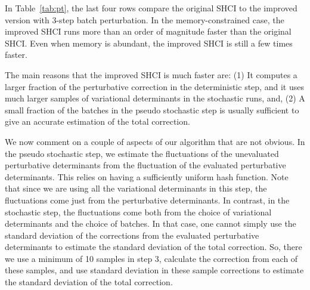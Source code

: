\documentclass[%
reprint,
 superscriptaddress,
 amsmath,amssymb,
 aps,
]{revtex4-1}
\begin{document}

In Table~\ref{tab:pt}, the last four rows compare the original SHCI to the improved version with 3-step batch perturbation.
In the memory-constrained case, the improved SHCI runs more than an order of magnitude faster than the original SHCI.
Even when memory is abundant, the improved SHCI is still a few times faster.

The main reasons that the improved SHCI is much faster are:
(1) It computes a larger fraction of the perturbative correction in the deterministic step, and it uses much larger samples
of variational determinants in the stochastic runs,
and,
(2) A small fraction of the batches in the pseudo stochastic step is usually sufficient to give an accurate estimation of the total correction.

We now comment on a couple of aspects of our algorithm that are not obvious.
In the pseudo stochastic step, we estimate the fluctuations of the unevaluated perturbative determinants from the fluctuation of the evaluated perturbative determinants.
This relies on having a sufficiently uniform hash function.
Note that since we are using all the variational determinants in this step,
the fluctuations come just from the perturbative determinants.
In contrast, in the stochastic step, the fluctuations come both from the choice of variational determinants and the choice of batches.
In that case, one cannot simply use the standard deviation of the corrections from the evaluated perturbative determinants to estimate the standard deviation of the total correction.
So, there we use a minimum of 10 samples in step 3, calculate the correction from each of these samples, and use standard deviation in these sample corrections to estimate the standard deviation of the total correction.
\end{document}
